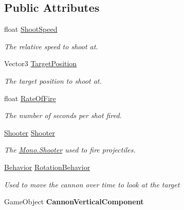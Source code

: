 \subsection*{Public Attributes}
\begin{DoxyCompactItemize}
\item 
float \hyperlink{class_skyrates_1_1_entity_1_1_entity_cannon_a9ee533d27944ebec7884f18fa97b9eb9}{Shoot\-Speed}
\begin{DoxyCompactList}\small\item\em The relative speed to shoot at. \end{DoxyCompactList}\item 
Vector3 \hyperlink{class_skyrates_1_1_entity_1_1_entity_cannon_a827e5c62b130603513eae3f4c51a230f}{Target\-Position}
\begin{DoxyCompactList}\small\item\em The target position to shoot at. \end{DoxyCompactList}\item 
float \hyperlink{class_skyrates_1_1_entity_1_1_entity_cannon_abf2a1d1e7fc1a134c3f557437ec5d7f8}{Rate\-Of\-Fire}
\begin{DoxyCompactList}\small\item\em The number of seconds per shot fired. \end{DoxyCompactList}\item 
\hyperlink{class_skyrates_1_1_mono_1_1_shooter}{Shooter} \hyperlink{class_skyrates_1_1_entity_1_1_entity_cannon_a1d1ce67467d722f4088c53cb14c56d8a}{Shooter}
\begin{DoxyCompactList}\small\item\em The \hyperlink{class_skyrates_1_1_mono_1_1_shooter}{Mono.\-Shooter} used to fire projectiles. \end{DoxyCompactList}\item 
\hyperlink{class_skyrates_1_1_a_i_1_1_behavior}{Behavior} \hyperlink{class_skyrates_1_1_entity_1_1_entity_cannon_a4e01f1e37377d633ff6be1042b57903e}{Rotation\-Behavior}
\begin{DoxyCompactList}\small\item\em Used to move the cannon over time to look at the target \end{DoxyCompactList}\item 
\hypertarget{class_skyrates_1_1_entity_1_1_entity_cannon_a38b49861a0ca9de81d8d42d8e0e23a06}{Game\-Object {\bfseries Cannon\-Vertical\-Component}}\label{class_skyrates_1_1_entity_1_1_entity_cannon_a38b49861a0ca9de81d8d42d8e0e23a06}

\end{DoxyCompactItemize}
